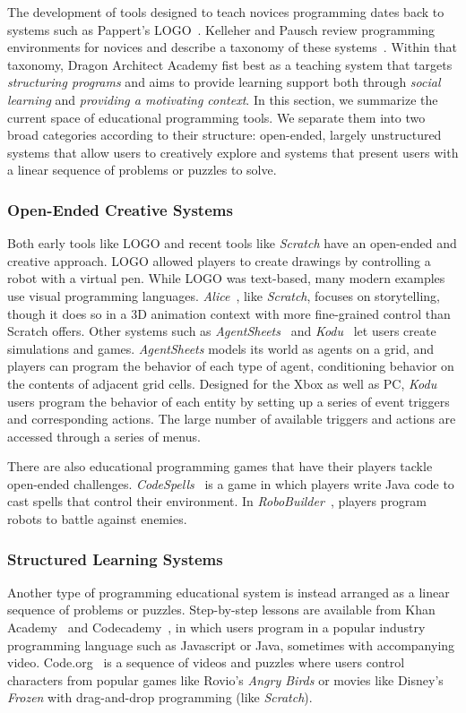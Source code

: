 \documentclass{sig-alternate}
\newcommand{\gametitle}{{\color{RoyalPurple} Dragon Architect Academy}}
\begin{document}
The development of tools designed to teach novices programming dates back to systems such as Pappert's LOGO~\cite{papert80mindstorms}.
Kelleher and Pausch review programming environments for novices and describe a taxonomy of these systems~\cite{kelleher2005lowering}.
Within that taxonomy, \gametitle{} fist best as a teaching system that targets \emph{structuring programs} and aims to provide learning support both through \emph{social learning} and \emph{providing a motivating context}. 
In this section, we summarize the current space of educational programming tools. 
We separate them into two broad categories according to their structure: open-ended, largely unstructured systems that allow users to creatively explore and systems that present users with a linear sequence of problems or puzzles to solve. 

\subsubsection{Open-Ended Creative Systems}
Both early tools like LOGO and recent tools like \emph{Scratch} have an open-ended and creative approach.
LOGO allowed players to create drawings by controlling a robot with a virtual pen.
While LOGO was text-based, many modern examples use visual programming languages. 
\emph{Alice}~\cite{cooper2000alice}, like \emph{Scratch}, focuses on storytelling, though it does so in a 3D animation context with more fine-grained control than Scratch offers.
Other systems such as \emph{AgentSheets}~\cite{repenning2000agentsheets} and \emph{Kodu}~\cite{kodu} let users create simulations and games.
\emph{AgentSheets} models its world as agents on a grid, and players can program the behavior of each type of agent, conditioning behavior on the contents of adjacent grid cells. 
Designed for the Xbox as well as PC, \emph{Kodu} users program the behavior of each entity by setting up a series of event triggers and corresponding actions. The large number of available triggers and actions are accessed through a series of menus. 

There are also educational programming games that have their players tackle open-ended challenges.
\emph{CodeSpells}~\cite{esper2013codespells} is a game in which players write Java code to cast spells that control their environment. 
In \emph{RoboBuilder}~\cite{weintrop2013robobuilder}, players program robots to battle against enemies.

\subsubsection{Structured Learning Systems}
Another type of programming educational system is instead arranged as a linear sequence of problems or puzzles.
Step-by-step lessons are available from Khan Academy~\cite{khanacademy} and Codecademy~\cite{codecademy}, in which users program in a popular industry programming language such as Javascript or Java, sometimes with accompanying video.
Code.org~\cite{codedotorg} is a sequence of videos and puzzles where users control characters from popular games like Rovio's \emph{Angry Birds} or movies like Disney's \emph{Frozen} with drag-and-drop programming (like \emph{Scratch}).
\end{document}
